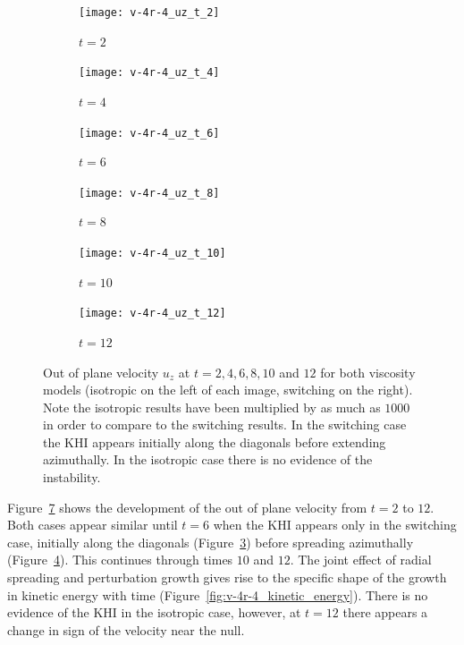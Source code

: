 \begin{figure}[t]
  \centering
    \begin{subfigure}{0.32\textwidth}
      \texttt{[image: v-4r-4\_uz\_t\_2]}
      \caption{$t=2$}
      \label{fig:v-4r-4_uz_t_2}
    \end{subfigure}
    \begin{subfigure}{0.32\textwidth}
      \texttt{[image: v-4r-4\_uz\_t\_4]}
      \caption{$t=4$}
      \label{fig:v-4r-4_uz_t_4}
    \end{subfigure}
    \begin{subfigure}{0.32\textwidth}
      \texttt{[image: v-4r-4\_uz\_t\_6]}
      \caption{$t=6$}
      \label{fig:v-4r-4_uz_t_6}
    \end{subfigure}
    \begin{subfigure}{0.32\textwidth}
      \texttt{[image: v-4r-4\_uz\_t\_8]}
      \caption{$t=8$}
      \label{fig:v-4r-4_uz_t_8}
    \end{subfigure}
    \begin{subfigure}{0.32\textwidth}
      \texttt{[image: v-4r-4\_uz\_t\_10]}
      \caption{$t=10$}
      \label{fig:v-4r-4_uz_t_10}
    \end{subfigure}
    \begin{subfigure}{0.32\textwidth}
      \texttt{[image: v-4r-4\_uz\_t\_12]}
      \caption{$t=12$}
      \label{fig:v-4r-4_uz_t_12}
    \end{subfigure}
\caption{Out of plane velocity $u_z$ at $t=2, 4, 6, 8, 10$ and $12$ for both viscosity models (isotropic on the left of each image, switching on the right). Note the isotropic results have been multiplied by as much as $1000$ in order to compare to the switching results. In the switching case the KHI appears initially along the diagonals before extending azimuthally. In the isotropic case there is no evidence of the instability.}
\label{fig:out_of_plane_velocity}%
\end{figure}

Figure~\ref{fig:out_of_plane_velocity} shows the development of the out of plane velocity from $t=2$ to $12$. Both cases appear similar until $t=6$ when the KHI appears only in the switching case, initially along the diagonals (Figure~\ref{fig:v-4r-4_uz_t_6}) before spreading azimuthally (Figure~\ref{fig:v-4r-4_uz_t_8}). This continues through times $10$ and $12$. The joint effect of radial spreading and perturbation growth gives rise to the specific shape of the growth in kinetic energy with time (Figure~\ref{fig:v-4r-4_kinetic_energy}). There is no evidence of the KHI in the isotropic case, however, at $t=12$ there appears a change in sign of the velocity near the null.

